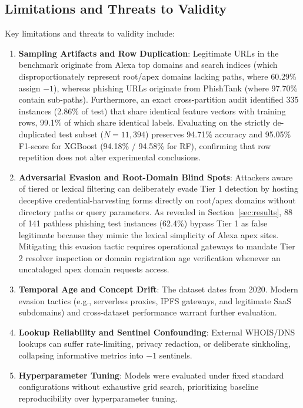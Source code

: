 \subsection{Limitations and Threats to Validity}
Key limitations and threats to validity include:
\begin{enumerate}
    \item \textbf{Sampling Artifacts and Row Duplication}: Legitimate URLs in the benchmark originate from Alexa top domains and search indices (which disproportionately represent root/apex domains lacking paths, where 60.29\% assign $-1$), whereas phishing URLs originate from PhishTank (where 97.70\% contain sub-paths). Furthermore, an exact cross-partition audit identified 335 instances (2.86\% of test) that share identical feature vectors with training rows, 99.1\% of which share identical labels. Evaluating on the strictly de-duplicated test subset ($N = 11,394$) preserves 94.71\% accuracy and 95.05\% F1-score for XGBoost (94.18\% / 94.58\% for RF), confirming that row repetition does not alter experimental conclusions.
    \item \textbf{Adversarial Evasion and Root-Domain Blind Spots}: Attackers aware of tiered or lexical filtering can deliberately evade Tier 1 detection by hosting deceptive credential-harvesting forms directly on root/apex domains without directory paths or query parameters. As revealed in Section~\ref{sec:results}, 88 of 141 pathless phishing test instances (62.4\%) bypass Tier 1 as false legitimate because they mimic the lexical simplicity of Alexa apex sites. Mitigating this evasion tactic requires operational gateways to mandate Tier 2 resolver inspection or domain registration age verification whenever an uncataloged apex domain requests access.
    \item \textbf{Temporal Age and Concept Drift}: The dataset dates from 2020. Modern evasion tactics (e.g., serverless proxies, IPFS gateways, and legitimate SaaS subdomains) and cross-dataset performance warrant further evaluation.
    \item \textbf{Lookup Reliability and Sentinel Confounding}: External WHOIS/DNS lookups can suffer rate-limiting, privacy redaction, or deliberate sinkholing, collapsing informative metrics into $-1$ sentinels.
    \item \textbf{Hyperparameter Tuning}: Models were evaluated under fixed standard configurations without exhaustive grid search, prioritizing baseline reproducibility over hyperparameter tuning.

\end{enumerate}
